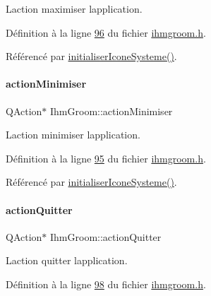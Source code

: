 L\textquotesingle{}action maximiser l\textquotesingle{}application. 



Définition à la ligne \hyperlink{ihmgroom_8h_source_l00096}{96} du fichier \hyperlink{ihmgroom_8h_source}{ihmgroom.\+h}.



Référencé par \hyperlink{ihmgroom_8cpp_source_l00106}{initialiser\+Icone\+Systeme()}.

\mbox{\label{class_ihm_groom_a4018ccf7f73329725e4c54002ae72f01}} 
\paragraph{\texorpdfstring{action\+Minimiser}{actionMinimiser}}
{\footnotesize\ttfamily Q\+Action$\ast$ Ihm\+Groom\+::action\+Minimiser\hspace{0.3cm}{\ttfamily [private]}}



L\textquotesingle{}action minimiser l\textquotesingle{}application. 



Définition à la ligne \hyperlink{ihmgroom_8h_source_l00095}{95} du fichier \hyperlink{ihmgroom_8h_source}{ihmgroom.\+h}.



Référencé par \hyperlink{ihmgroom_8cpp_source_l00106}{initialiser\+Icone\+Systeme()}.

\mbox{\label{class_ihm_groom_ab28c091688d25e93b2baf99b4aa90f07}} 
\paragraph{\texorpdfstring{action\+Quitter}{actionQuitter}}
{\footnotesize\ttfamily Q\+Action$\ast$ Ihm\+Groom\+::action\+Quitter\hspace{0.3cm}{\ttfamily [private]}}



L\textquotesingle{}action quitter l\textquotesingle{}application. 



Définition à la ligne \hyperlink{ihmgroom_8h_source_l00098}{98} du fichier \hyperlink{ihmgroom_8h_source}{ihmgroom.\+h}.



